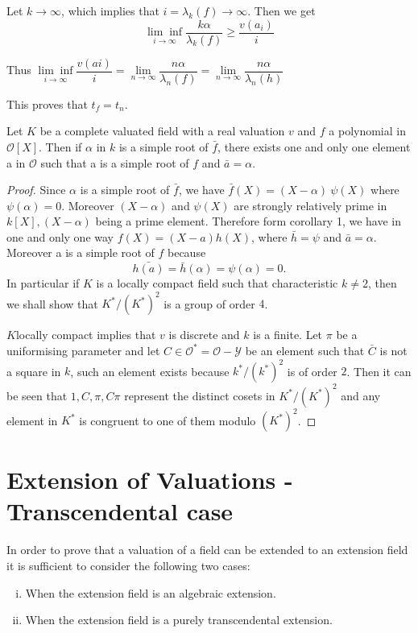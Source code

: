 Let $k \to \infty$, which implies that $i = \lambda_k (f) \to
\infty$. Then we get   
$$
\underset{i \to \infty}{\lim\inf}  \frac{k \alpha}{\lambda_k (f)} \geq
\frac{v(a_i)}{i} 
$$

Thus \qquad $\underset{i \to \infty}{\lim\inf} \dfrac{v (ai)}{i}=
\lim\limits_{n \to \infty} 
\dfrac{n \alpha}{\lambda_n (f)}= \lim\limits_{n \to \infty} \dfrac{n
  \alpha}{\lambda_n (h)}$  

This proves that $t_f = t_n$.

\begin{corollary}\label{part1:chap2:sec1:coro2}%
  Let $K$ be a complete valuated field with a real valuation $v$ and
  $f$ a polynomial in $\mathscr{O}[X]$. Then if $\alpha$ in $k$ is a
  simple root of $\bar{f}$, there exists one and only one element a in
  $\mathscr{O}$ such that a is a simple root of $f$ and $\bar{a}=
  \alpha$. 
\end{corollary}

\begin{proof}%
  Since $\alpha$ is a simple root of $\bar{f}$, we have $\bar{f}(X)=
  (X- \alpha)~ \psi (X)$ where $\psi (\alpha)=0$. Moreover $(X-\alpha)$
  and $\psi (X)$ are strongly relatively prime in $k[X], (X-\alpha)$
  being a prime element. Therefore form corollary 1, we have in one
  and only one way $f(X) = (X-a) h(X)$, where $\bar{h}= \psi$ and
  $\bar{a}= \alpha$. Moreover a is a simple root of $f$ because 
  $$
  \bar{h(a)}= \bar{h}(\alpha)= \psi (\alpha)=0.
  $$
  In particular if $K$ is a locally compact field such that
  characteristic $k \neq 2$, then we shall show that $K^*/ (K^*)^2$ is a
  group of order $4$. 
  
  $K$\pageoriginale locally compact implies that $v$ is discrete and $k$ is a
  finite. Let $\pi$ be a uniformising parameter and let $C \in
  \mathscr{O}^* = \mathscr{O}-\mathscr{Y}$ be an element such that
  $\bar{C}$ is not a square in $k$, such an element exists because $k^*
  /(k^*)^2$ is of order $2$. Then it can be seen that $1,C, \pi, C \pi$
  represent the distinct cosets in $K^*/ (K^*)^2$ and any element in
  $K^*$ is congruent to one  of them modulo $(K^*)^2$. 
\end{proof}

\section{Extension of Valuations - Transcendental case}\label{part1:chap2:sec2}

In order to prove that a valuation of a field can be extended to an
extension field it is sufficient to consider the following two cases: 
\begin{enumerate}[(i)]
\item When the extension field is an algebraic extension.
\item When the extension field is a purely transcendental extension.
\end{enumerate}

